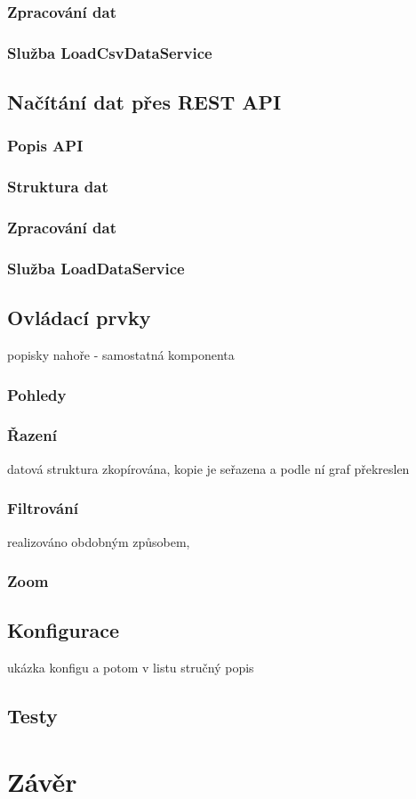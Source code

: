 \documentclass[
  digital, %
  oneside, %
  table,   %
  nolof,     %
  nolot,     %
]{fithesis3}
\begin{document}
\subsection{Zpracování dat}
\subsection{Služba LoadCsvDataService}

\section{Načítání dat přes REST API}
\subsection{Popis API}
\subsection{Struktura dat}
\subsection{Zpracování dat}
\subsection{Služba LoadDataService}

\section{Ovládací prvky}
popisky nahoře - samostatná komponenta
\subsection{Pohledy}
\subsection{Řazení}
datová struktura zkopírována, kopie je seřazena a podle ní graf překreslen
\subsection{Filtrování}
realizováno obdobným způsobem, 
\subsection{Zoom}

\section{Konfigurace}
ukázka konfigu a potom v listu stručný popis

\section{Testy}

\chapter{Závěr}

\printbibliography
\end{document}
